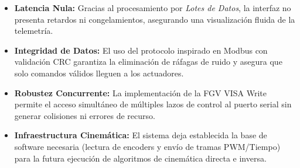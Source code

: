 \clearpage
\begin{resultadosFase}
	\begin{itemize}
		\item \textbf{Latencia Nula:} Gracias al procesamiento por \textit{Lotes de Datos}, la interfaz no presenta retardos ni congelamientos, asegurando una visualización fluida de la telemetría.
		\item \textbf{Integridad de Datos:} El uso del protocolo inspirado en Modbus con validación CRC garantiza la eliminación de ráfagas de ruido y asegura que solo comandos válidos lleguen a los actuadores.
		\item \textbf{Robustez Concurrente:} La implementación de la FGV VISA Write permite el acceso simultáneo de múltiples lazos de control al puerto serial sin generar colisiones ni errores de recurso.
		\item \textbf{Infraestructura Cinemática:} El sistema deja establecida la base de software necesaria (lectura de encoders y envío de tramas PWM/Tiempo) para la futura ejecución de algoritmos de cinemática directa e inversa.
	\end{itemize}
\end{resultadosFase}
